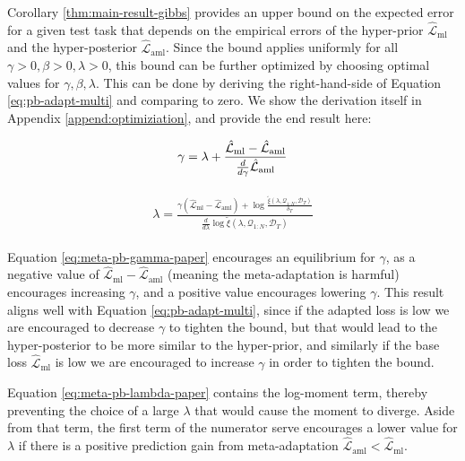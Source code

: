 \documentclass{article}
\theoremstyle{definition}
\begin{document}
Corollary \ref{thm:main-result-gibbs} provides an upper bound on the expected error for a given test task that depends on the empirical errors of the hyper-prior $\hat{\mathcal{L}}_{\mathrm{ml}}$ and the hyper-posterior $\hat{\mathcal{L}}_{\mathrm{aml}}$. 
Since the bound applies uniformly for all $\gamma>0,\beta>0,\lambda>0$, this bound can be further optimized by choosing optimal values for $\gamma, \beta, \lambda$. This can be done by deriving the right-hand-side of Equation \ref{eq:pb-adapt-multi} and comparing to zero. 
We show the derivation itself in Appendix \ref{append:optimiziation}, and provide the end result here:

\begin{align} \label{eq:meta-pb-gamma-paper}
\begin{split}
\gamma = \lambda+\frac{\hat{\mathcal{L}}_{\mathrm{ml}}-\hat{\mathcal{L}}_{\mathrm{aml}}}{\frac{d}{d\gamma}\hat{\mathcal{L}}_{\mathrm{aml}}}
\end{split}\hfill
\end{align}

\begin{align} \label{eq:meta-pb-lambda-paper}
\begin{split}
\lambda = \frac{\gamma(\hat{\mathcal{L}}_{\mathrm{ml}}-\hat{\mathcal{L}}_{\mathrm{aml}})+\log\frac{\tilde{\xi}(\lambda,\mathcal{Q}_{1:N},\mathcal{D}_T)}{\delta_T}}{\frac{d}{d\lambda}\log\tilde{\xi}(\lambda,\mathcal{Q}_{1:N},\mathcal{D}_T)}
\end{split}
\end{align}

Equation \ref{eq:meta-pb-gamma-paper} encourages an equilibrium for $\gamma$, as a negative value of $\hat{\mathcal{L}}_{\mathrm{ml}}-\hat{\mathcal{L}}_{\mathrm{aml}}$ (meaning the meta-adaptation is harmful) encourages increasing $\gamma$, and a positive value encourages lowering $\gamma$.
This result aligns well with Equation \ref{eq:pb-adapt-multi}, since if the adapted loss is low we are encouraged to decrease $\gamma$ to tighten the bound, but that would lead to the hyper-posterior to be more similar to the hyper-prior, and similarly if the base loss $\hat{\mathcal{L}}_{\mathrm{ml}}$ is low we are encouraged to increase $\gamma$ in order to tighten the bound.

Equation \ref{eq:meta-pb-lambda-paper} contains the log-moment term, thereby preventing the choice of a large $\lambda$ that would cause the moment to diverge. Aside from that term, 
the first term of the numerator serve encourages a lower value for $\lambda$ if there is a positive prediction gain from meta-adaptation $\hat{\mathcal{L}}_{\mathrm{aml}}<\hat{\mathcal{L}}_{\mathrm{ml}}$.
\end{document}
